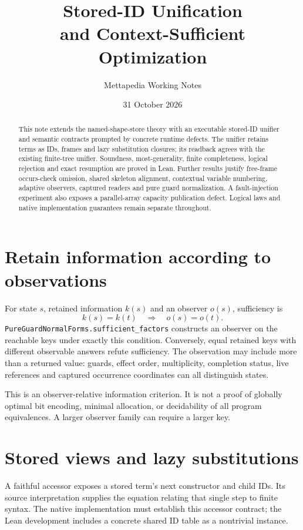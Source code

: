 \documentclass[11pt,a4paper]{article}
\title{Stored-ID Unification\\
  \large and Context-Sufficient Optimization}
\author{Mettapedia Working Notes}
\date{31 October 2026}
\newcommand{\code}[1]{\nolinkurl{#1}}
\begin{document}
\maketitle

\begin{abstract}
This note extends the named-shape-store theory with an executable stored-ID
unifier and semantic contracts prompted by concrete runtime defects. The
unifier retains terms as IDs, frames and lazy substitution closures; its
readback agrees with the existing finite-tree unifier. Soundness,
most-generality, finite completeness, logical rejection and exact resumption
are proved in Lean. Further results justify free-frame occurs-check omission,
shared skeleton alignment, contextual variable numbering, adaptive observers,
captured readers and pure guard normalization. A fault-injection experiment
also exposes a parallel-array capacity publication defect. Logical laws and
native implementation guarantees remain separate throughout.
\end{abstract}

\section{Retain information according to observations}

For state $s$, retained information $k(s)$ and an observer $o(s)$, sufficiency is
\[
        k(s)=k(t)\quad\Longrightarrow\quad o(s)=o(t).
\]
\code{PureGuardNormalForms.sufficient_factors} constructs an observer on the
reachable keys under exactly this condition. Conversely, equal retained keys
with different observable answers refute sufficiency. The observation may
include more than a returned value: guards, effect order, multiplicity,
completion status, live references and captured occurrence coordinates can
all distinguish states.

This is an observer-relative information criterion. It is not a proof of
globally optimal bit encoding, minimal allocation, or decidability of all
program equivalences. A larger observer family can require a larger key.

\section{Stored views and lazy substitutions}

A faithful accessor exposes a stored term's next constructor and child IDs.
Its source interpretation supplies the equation relating that single step to
finite syntax. The native implementation must establish this accessor
contract; the Lean development includes a concrete shared ID table as a
nontrivial instance.
\end{document}
